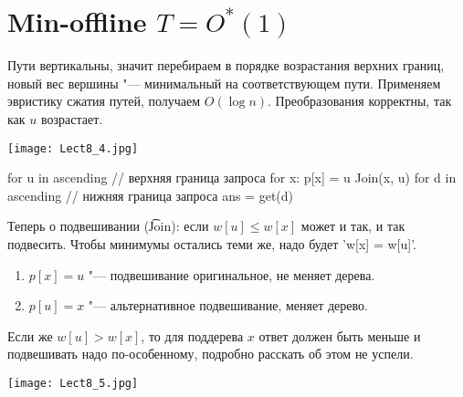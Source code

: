 \section{Min-offline \texorpdfstring{$T =  O^*(1)$}{T = O*(1)}}

Пути вертикальны, значит перебираем в порядке возрастания верхних границ, новый вес вершины "--- минимальный на соответствующем пути.
Применяем эвристику сжатия путей, получаем $O(\log n)$.
Преобразования корректны, так как $u$ возрастает.

\begin{center}
	\texttt{[image: Lect8\_4.jpg]}
\end{center}

\begin{cppcode}
for u in ascending // верхняя граница запроса
	for x: p[x] = u
		Join(x, u)
	for d in ascending // нижняя граница запроса
		ans = get(d)
\end{cppcode}

Теперь о подвешивании (\t{Join}): если $w[u] \le w[x]$ может и так, и так подвесить.
Чтобы минимумы остались теми же, надо будет \cpp'w[x] = w[u]'.

\begin{enumerate}
	\item $p[x] = u$ "--- подвешивание оригинальное, не меняет дерева.
	\item $p[u] = x$ "--- альтернативное подвешивание, меняет дерево.
\end{enumerate}

Если же $w[u] > w[x]$, то для поддерева $x$ ответ должен быть меньше и подвешивать надо по-особенному, подробно расскать об этом не успели.

\begin{center}
\texttt{[image: Lect8\_5.jpg]}
\end{center}
